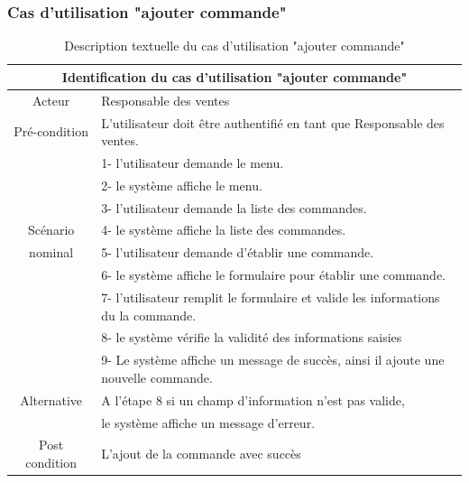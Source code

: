 \documentclass[edit,12pt,a4paper,ChapStyle,oneside,doubleinterligne]{report}
\begin{document}
\subsubsection{Cas d'utilisation "ajouter commande"}
\begin{table}[h!]
    \centering
    \begin{tabular}{|c|m{10cm}|}
        \hline
             \multicolumn{2}{|c|}{Identification du cas d'utilisation "ajouter commande" }\\
             \hline
             Acteur & Responsable des ventes\\
             \hline
             Pré-condition & L'utilisateur doit être authentifié en tant que Responsable des ventes. \\
             \hline
              & 1- l'utilisateur demande le menu.\\
              & 2- le système affiche le menu. \\
              & 3- l'utilisateur demande la liste des commandes.\\
              Scénario& 4- le système affiche la liste des commandes. \\ 
              nominal& 5- l'utilisateur demande d'établir une commande.\\
              & 6- le système affiche le formulaire pour établir une commande. \\
              & 7- l'utilisateur remplit le formulaire et valide les informations du la commande. \\
              & 8- le système vérifie la validité des informations saisies\\
              & 9- Le système affiche un message de succès, ainsi il ajoute une nouvelle commande.\\
              
             \hline
             Alternative  & A l’étape 8 si un champ d’information n’est pas valide,  \\
             & le système affiche un message d’erreur.\\
             \hline
             Post condition& L’ajout de la commande avec succès \\
             \hline
        \end{tabular}
    \caption{Description textuelle du cas d'utilisation "ajouter commande"}
    \label{tab:cas1}
\end{table}
\end{document}
